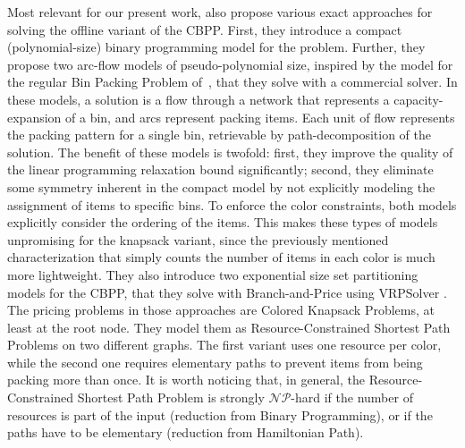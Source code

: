 \documentclass[preprint,11pt]{elsarticle}
\theoremstyle{definition}
\begin{document}
Most relevant for our present work, \citet{BorgesSM24} also propose various exact approaches for solving the offline variant of the CBPP.
First, they introduce a compact (polynomial-size) binary programming model for the problem.
Further, they propose two arc-flow models of pseudo-polynomial size, inspired by the model for the regular Bin Packing Problem of~\citet{ValérioDeCarvalho1999629}, that they solve with a commercial solver.
In these models, a solution is a flow through a network that represents a capacity-expansion of a bin, and arcs represent packing items. 
Each unit of flow represents the packing pattern for a single bin, retrievable by path-decomposition of the solution. 
The benefit of these models is twofold:
first, they improve the quality of the linear programming relaxation bound significantly;
second, they eliminate some symmetry inherent in the compact model by not explicitly modeling the assignment of items to specific bins.
To enforce the color constraints, both models explicitly consider the ordering of the items.
This makes these types of models unpromising for the knapsack variant, since the previously mentioned characterization that simply counts the number of items in each color is much more lightweight. 
They also introduce two exponential size set partitioning models for the CBPP, that they solve with Branch-and-Price using VRPSolver \citep{PessoaSUV20}. 
The pricing problems in those approaches are Colored Knapsack Problems, at least at the root node. 
They model them as Resource-Constrained Shortest Path Problems on two different graphs. 
The first variant uses one resource per color, while the second one requires elementary paths to prevent items from being packing more than once. 
It is worth noticing that, in general, the Resource-Constrained Shortest Path Problem is strongly $\mathcal{NP}$-hard if the number of resources is part of the input (reduction from Binary Programming), or if the paths have to be elementary (reduction from Hamiltonian Path).
\end{document}
